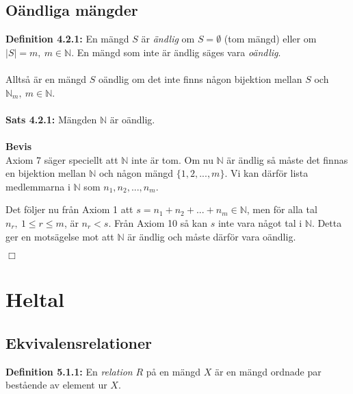 \documentclass{article}
\begin{document}
\subsection{Oändliga mängder}
\textbf{Definition 4.2.1:} En mängd $S$ är \textit{ändlig} om $S=\emptyset$ (tom mängd) eller om $|S|=m, \ m\in\mathbb{N}$. En mängd som inte är ändlig säges vara \textit{oändlig}.\\ \\
Alltså är en mängd $S$ oändlig om det inte finns någon bijektion mellan $S$ och $\mathbb{N}_m, \ m\in\mathbb{N}$.\\ \\
\textbf{Sats 4.2.1:} Mängden $\mathbb{N}$ är oändlig.\\ \\
\textbf{Bevis}\\
Axiom 7 säger speciellt att $\mathbb{N}$ inte är tom. Om nu $\mathbb{N}$ är ändlig så måste det finnas en bijektion mellan $\mathbb{N}$ och någon mängd $\{1,2,...,m\}$. Vi kan därför lista medlemmarna i $\mathbb{N}$ som $n_1,n_2,...,n_m$.

Det följer nu från Axiom 1 att $s=n_1+n_2+...+n_m\in\mathbb{N}$, men för alla tal $n_r, \ 1\leq r\leq m$, är $n_r<s$. Från Axiom 10 så kan $s$ inte vara något tal i $\mathbb{N}$. Detta ger en motsägelse mot att $\mathbb{N}$ är ändlig och måste därför vara oändlig.
\begin{flushright}
$\Box$
\end{flushright}
\section{Heltal}
\subsection{Ekvivalensrelationer}
\textbf{Definition 5.1.1:} En \textit{relation} $R$ på en mängd $X$ är en mängd ordnade par bestående av element ur $X$.\\
\end{document}
